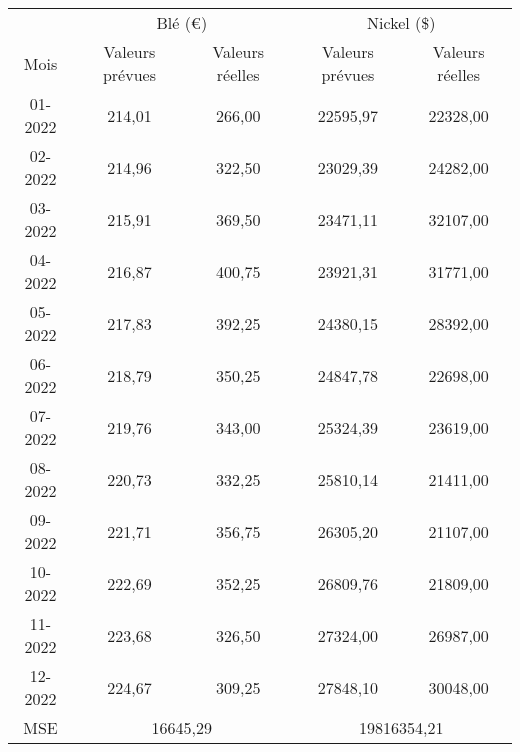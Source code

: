 \begin{tabular}{ccccc}
      \toprule
      & \multicolumn{2}{c}{Blé (\euro)} & \multicolumn{2}{c}{Nickel (\$)} \\
      Mois & Valeurs prévues & Valeurs réelles & Valeurs prévues & Valeurs réelles \\
      \cmidrule(r){1-1}\cmidrule(lr){2-3}\cmidrule(lr){4-5}
      01-2022 & 214,01 & 266,00 & 22595,97 & 22328,00 \\
      02-2022 & 214,96 & 322,50 & 23029,39 & 24282,00 \\
      03-2022 & 215,91 & 369,50 & 23471,11 & 32107,00 \\
      04-2022 & 216,87 & 400,75 & 23921,31 & 31771,00 \\
      05-2022 & 217,83 & 392,25 & 24380,15 & 28392,00 \\
      06-2022 & 218,79 & 350,25 & 24847,78 & 22698,00 \\
      07-2022 & 219,76 & 343,00 & 25324,39 & 23619,00 \\
      08-2022 & 220,73 & 332,25 & 25810,14 & 21411,00 \\
      09-2022 & 221,71 & 356,75 & 26305,20 & 21107,00 \\
      10-2022 & 222,69 & 352,25 & 26809,76 & 21809,00 \\
      11-2022 & 223,68 & 326,50 & 27324,00 & 26987,00 \\
      12-2022 & 224,67 & 309,25 & 27848,10 & 30048,00 \\
      \cmidrule(r){1-1}\cmidrule(lr){2-3}\cmidrule(lr){4-5}
      MSE & \multicolumn{2}{c}{16645,29} & \multicolumn{2}{c}{19816354,21} \\
\bottomrule
\end{tabular}%
